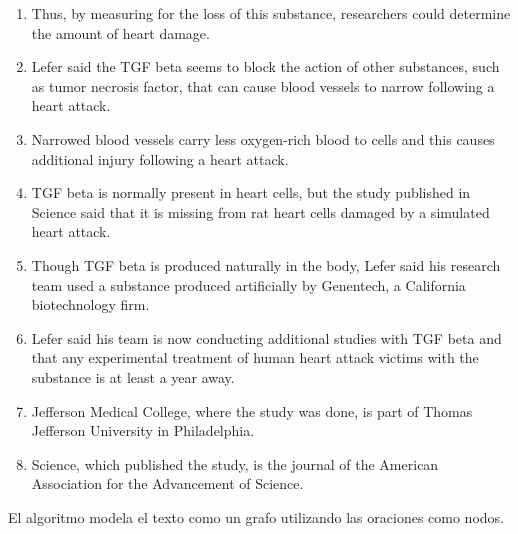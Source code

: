 \documentclass{llncs}
\begin{document}
{{{\begin{enumerate}
\item Thus, by measuring for the loss of this substance, researchers could determine the amount of heart damage.
\item Lefer said the TGF beta seems to block the action of other substances, such as tumor necrosis factor, that can cause blood vessels to narrow following a heart attack.
\item Narrowed blood vessels carry less oxygen-rich blood to cells and this causes additional injury following a heart attack.
\item TGF beta is normally present in heart cells, but the study published in Science said that it is missing from rat heart cells damaged by a simulated heart attack.
\item Though TGF beta is produced naturally in the body, Lefer said his research team used a substance produced artificially by Genentech, a California biotechnology firm.
\item Lefer said his team is now conducting additional studies with TGF beta and that any experimental treatment of human heart attack victims with the substance is at least a year away.
\item Jefferson Medical College, where the study was done, is part of Thomas Jefferson University in Philadelphia.
\item Science, which published the study, is the journal of the American Association for the Advancement of Science. 
\end{enumerate}
}
    }%
}


El algoritmo modela el texto como un grafo utilizando las oraciones como nodos.
\end{document}
